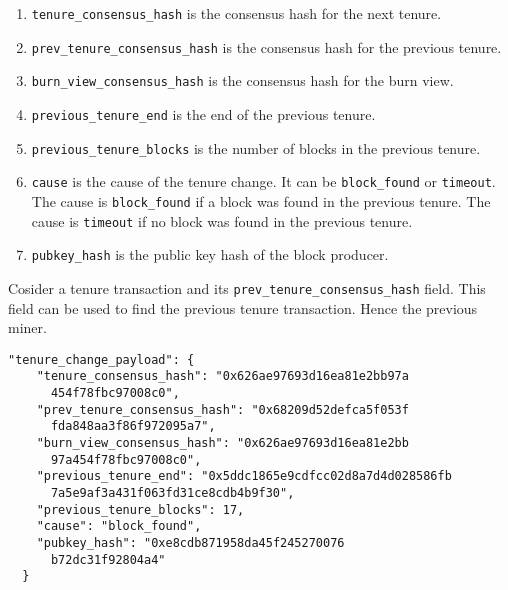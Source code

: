 \documentclass[12pt]{article}
\begin{document}
\begin{enumerate}   

\item \lstinline|tenure_consensus_hash| is the consensus hash for the next tenure.

\item \lstinline|prev_tenure_consensus_hash| is the consensus hash for the previous tenure.

\item \lstinline|burn_view_consensus_hash| is the consensus hash for the burn view.

\item \lstinline|previous_tenure_end| is the end of the previous tenure.  

\item \lstinline|previous_tenure_blocks| is the number of blocks in the previous tenure.

\item \lstinline|cause| is the cause of the tenure change.  It can be \lstinline|block_found| or \lstinline|timeout|.
The cause is \lstinline|block_found| if a block was found in the previous tenure.
The cause is \lstinline|timeout| if no block was found in the previous tenure.

\item \lstinline|pubkey_hash| is the public key hash of the block producer.

\end{enumerate}
%

Cosider a tenure transaction and its \lstinline|prev_tenure_consensus_hash| field.
This field can be used to find the previous tenure transaction. 
Hence the previous miner. 

%
%
\vspace{0.25in}
%
%

%
%
\begin{lstlisting}[label=JsonTenure,style=json, caption={Tenure part}]
  "tenure_change_payload": {
    "tenure_consensus_hash": "0x626ae97693d16ea81e2bb97a
      454f78fbc97008c0",
    "prev_tenure_consensus_hash": "0x68209d52defca5f053f
      fda848aa3f86f972095a7",
    "burn_view_consensus_hash": "0x626ae97693d16ea81e2bb
      97a454f78fbc97008c0",
    "previous_tenure_end": "0x5ddc1865e9cdfcc02d8a7d4d028586fb
      7a5e9af3a431f063fd31ce8cdb4b9f30",
    "previous_tenure_blocks": 17,
    "cause": "block_found",
    "pubkey_hash": "0xe8cdb871958da45f245270076
      b72dc31f92804a4"
  }
\end{lstlisting}
\end{document}

